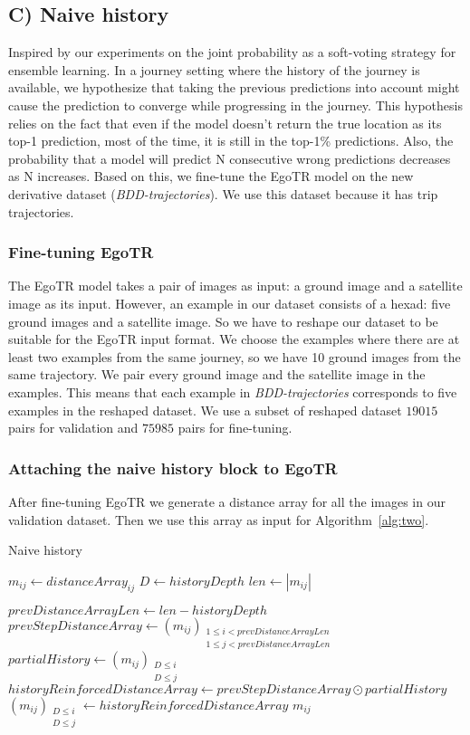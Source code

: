 \documentclass[10pt,letterpaper]{article}
\begin{document}
\subsection*{C) Naive history}
Inspired by our experiments on the joint probability as a soft-voting strategy for ensemble learning. In a journey setting where the history of the journey is available, we hypothesize that taking the previous predictions into account might cause the prediction to converge while progressing in the journey. This hypothesis relies on the fact that even if the model doesn't return the true location as its top-1 prediction, most of the time, it is still in the top-1\% predictions. Also, the probability that a model will predict N consecutive wrong predictions decreases as N increases. Based on this, we fine-tune the EgoTR model on the new derivative dataset (\emph{BDD-trajectories}). We use this dataset because it has trip trajectories.

\subsubsection*{Fine-tuning EgoTR}
The EgoTR model takes a pair of images as input: a ground image and a satellite image as its input. However, an example in our dataset consists of a hexad: five ground images and a satellite image. So we have to reshape our dataset to be suitable for the EgoTR input format. We choose the examples where there are at least two examples from the same journey, so we have 10 ground images from the same trajectory. We pair every ground image and the satellite image in the examples. This means that each example in \emph{BDD-trajectories} corresponds to five examples in the reshaped dataset. We use a subset of reshaped dataset $19015$ pairs for validation and $75985$ pairs for fine-tuning.

\subsubsection*{Attaching the naive history block to EgoTR}
After fine-tuning EgoTR we generate a distance array for all the images in our validation dataset. Then we use this array as input for Algorithm~\ref{alg:two}.

\begin{algorithm}[H]
  \label{algorithm2}
  \caption{Naive history}\label{alg:two}
  $m_{ij} \gets distanceArray_{ij}$\;
  $D \gets historyDepth$\;
  $len \gets |m_{ij}|$\;
  
   {
      $prevDistanceArrayLen \gets len - historyDepth$\;
      $prevStepDistanceArray \gets (m_{ij})_{\substack{1\le i < prevDistanceArrayLen \\ 1\le j < prevDistanceArrayLen }}$\;
      $partialHistory \gets (m_{ij})_{\substack{D \le i \\ D \le j}}$\;
      $historyReinforcedDistanceArray \gets prevStepDistanceArray \odot partialHistory$\;
      $(m_{ij})_{\substack{D \le i \\ D \le j}} \gets historyReinforcedDistanceArray$\;
  }
  \Return $m_{ij}$\;
\end{algorithm}
\end{document}
